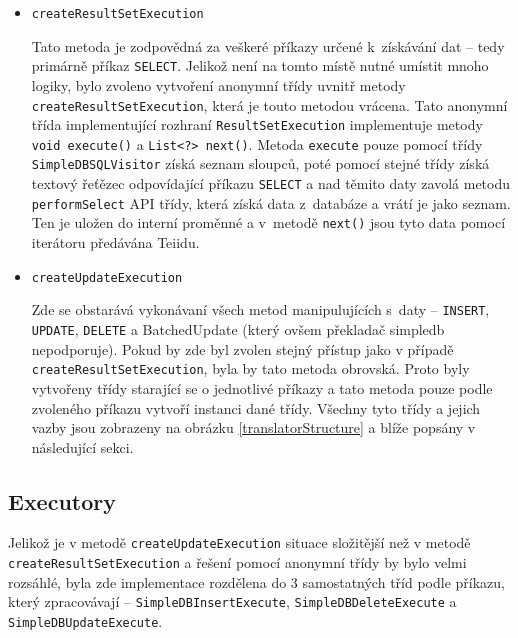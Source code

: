\documentclass[oneside,12pt]{fithesis2}
\begin{document}
\begin{itemize}
 \item \texttt{createResultSetExecution}

Tato metoda je zodpovědná za veškeré příkazy určené k~získávání dat -- tedy primárně příkaz \texttt{SELECT}. Jelikož není na tomto místě nutné umístit mnoho logiky, bylo zvoleno vytvoření anonymní třídy uvnitř metody \texttt{createResultSet\allowbreak Execution}, která je touto metodou vrácena. Tato anonymní třída implementující rozhraní \texttt{ResultSetExecution} implementuje metody \texttt{void execute()} a \texttt{List<?> next()}. Metoda \texttt{execute} pouze pomocí třídy \texttt{SimpleDB\allowbreak SQLVisitor} získá seznam sloupců, poté pomocí stejné třídy získá textový řeťězec odpovídající příkazu \texttt{SELECT} a nad těmito daty zavolá metodu \texttt{performSelect} API třídy, která získá data z~databáze a vrátí je jako seznam. Ten je uložen do interní proměnné a v~metodě \texttt{next()} jsou tyto data pomocí iterátoru předávána Teiidu.

\item \texttt{createUpdateExecution}

Zde se obstarává vykonávaní všech metod manipulujících s~daty -- \texttt{INSERT}, \texttt{UPDATE}, \texttt{DELETE} a BatchedUpdate (který ovšem překladač simpledb nepodporuje). Pokud by zde byl zvolen stejný přístup jako v případě \texttt{createResult\allowbreak SetExecution}, byla by tato metoda obrovská. Proto byly vytvořeny třídy starající se o jednotlivé příkazy a tato metoda pouze podle zvoleného příkazu vytvoří instanci dané třídy. Všechny tyto třídy a jejich vazby jsou zobrazeny na obrázku \ref{translatorStructure} a blíže popsány v následující sekci.
\end{itemize}
\subsection{Executory}
Jelikož je v metodě \texttt{createUpdateExecution} situace složitější než v metodě \texttt{createResultSetExecution} a řešení pomocí anonymní třídy by bylo velmi rozsáhlé, byla zde implementace rozdělena do 3 samostatných tříd podle příkazu, který zpracovávají -- \texttt{SimpleDBInsertExecute}, \texttt{SimpleDBDeleteExecute} a \texttt{SimpleDBUpdateExecute}.
\end{document}
